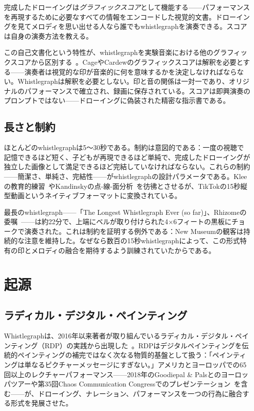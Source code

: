\documentclass[10pt,letterpaper,twocolumn]{article}
\begin{document}
完成したドローイングは\emph{グラフィックスコア}として機能する——パフォーマンスを再現するために必要なすべての情報をエンコードした視覚的文書。ドローイングを見てメロディを思い出せる人なら誰でもwhistlegraphを演奏できる。スコアは自身の演奏方法を教える。

この自己文書化という特性が、whistlegraphを実験音楽における他のグラフィックスコアから区別する~\citep{magnusson2010designing}。CageやCardewのグラフィックスコアは解釈を必要とする——演奏者は視覚的な印が音楽的に何を意味するかを決定しなければならない。Whistlegraphは解釈を必要としない。印と音の関係は一対一であり、オリジナルのパフォーマンスで確立され、録画に保存されている。スコアは即興演奏のプロンプトではない——ドローイングに偽装された精密な指示書である。

\subsection{長さと制約}

ほとんどのwhistlegraphは5〜30秒である。制約は意図的である：一度の視聴で記憶できるほど短く、子どもが再現できるほど単純で、完成したドローイングが独立した画像として満足できるほど完結していなければならない。これらの制約——簡潔さ、単純さ、完結性——がwhistlegraphの設計パラメータである。Kleeの教育的練習~\citep{klee1925pedagogical}やKandinskyの点-線-面分析~\citep{kandinsky1926point}を彷彿とさせるが、TikTokの15秒縦型動画というネイティブフォーマットに変換されている。

最長のwhistlegraph——「The Longest Whistlegraph Ever (so far)」、Rhizomeの委嘱~\citep{rhizome2022longest}——は約22分で、上端にベルが取り付けられた4×6フィートの黒板にチョークで演奏された。これは制約を証明する例外である：New Museumの観客は持続的な注意を維持した。なぜなら数百の15秒whistlegraphによって、この形式特有の印とメロディの融合を期待するよう訓練されていたからである。

\section{起源}

\subsection{ラディカル・デジタル・ペインティング}

Whistlegraphは、2016年以来著者が取り組んでいるラディカル・デジタル・ペインティング（RDP）の実践から出現した~\citep{scudder2017manifesto}。RDPはデジタルペインティングを伝統的ペインティングの補完ではなく次なる物質的基盤として扱う：「ペインティングは単なるピクチャーメッセージにすぎない。」アメリカとヨーロッパでの65回以上のレクチャーパフォーマンス——2018年のGoodiepal \& Palsとのヨーロッパツアーや第35回Chaos Communication Congressでのプレゼンテーション~\citep{scudder2018rdp35c3}を含む——が、ドローイング、ナレーション、パフォーマンスを一つの行為に融合する形式を発展させた。
\end{document}
